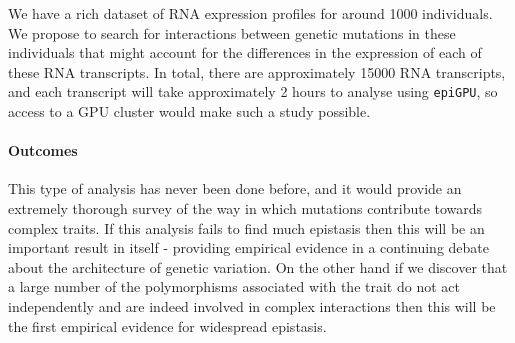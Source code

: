 \documentclass{scrartcl}
\begin{document}
We have a rich dataset of RNA expression profiles for around 1000 individuals. We propose to search for interactions between genetic mutations in these individuals that might account for the differences in the expression of each of these RNA transcripts. In total, there are approximately 15000 RNA transcripts, and each transcript will take approximately 2 hours to analyse using {\tt epiGPU}, so access to a GPU cluster would make such a study possible.


\paragraph{Outcomes}

This type of analysis has never been done before, and it would provide an extremely thorough survey of the way in which mutations contribute towards complex traits. If this analysis fails to find much epistasis then this will be an important result in itself - providing empirical evidence in a continuing debate about the architecture of genetic variation. On the other hand if we discover that a large number of the polymorphisms associated with the trait do not act independently and are indeed involved in complex interactions then this will be the first empirical evidence for widespread epistasis.
\end{document}
